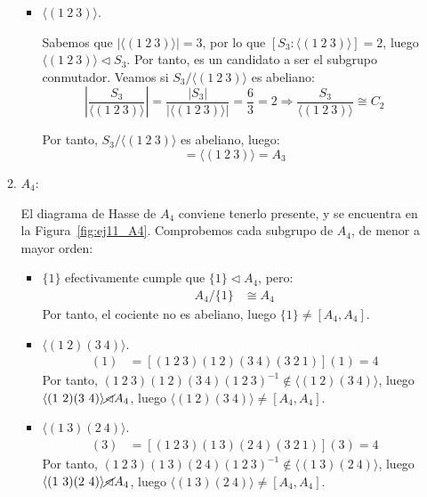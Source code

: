 \begin{ejercicio}
\begin{enumerate}
\begin{enumerate}
\begin{itemize}
                \item $\langle (1\ 2\ 3)\rangle$.
                
                Sabemos que $|\langle (1\ 2\ 3)\rangle|=3$, por lo que $[S_3:\langle (1\ 2\ 3)\rangle]=2$, luego $\langle (1\ 2\ 3)\rangle \lhd S_3$. Por tanto, es un candidato a ser el subgrupo conmutador. Veamos si $S_3/\langle (1\ 2\ 3)\rangle$ es abeliano:
                \begin{equation*}
                    \left|\dfrac{S_3}{\langle (1\ 2\ 3)\rangle}\right| = \frac{|S_3|}{|\langle (1\ 2\ 3)\rangle|} = \frac{6}{3} = 2
                    \Longrightarrow \dfrac{S_3}{\langle (1\ 2\ 3)\rangle} \cong C_2
                \end{equation*}

                Por tanto, $S_3/\langle (1\ 2\ 3)\rangle$ es abeliano, luego:
                \begin{equation*}
                    [S_3,S_3] = \langle (1\ 2\ 3)\rangle = A_3
                \end{equation*}
            \end{itemize}

            \item $A_4$:
            
            El diagrama de Hasse de $A_4$ conviene tenerlo presente, y se encuentra en la Figura~\ref{fig:ej11_A4}. Comprobemos cada subgrupo de $A_4$, de menor a mayor orden:
            \begin{itemize}
                \item $\{1\}$ efectivamente cumple que $\{1\}\lhd A_4$, pero:
                \begin{align*}
                    A_4/\{1\} &\cong A_4
                \end{align*}
                Por tanto, el cociente no es abeliano, luego $\{1\}\neq [A_4,A_4]$.

                \item $\langle (1\ 2)(3\ 4)\rangle$.
                \begin{align*}
                    [(1\ 2\ 3)(1\ 2)(3\ 4)(1\ 2\ 3)^{-1}](1) &= [(1\ 2\ 3)(1\ 2)(3\ 4)(3\ 2\ 1)](1) = 4
                \end{align*}
                Por tanto, $(1\ 2\ 3)(1\ 2)(3\ 4)(1\ 2\ 3)^{-1}\notin \langle (1\ 2)(3\ 4)\rangle$, luego $\langle (1\ 2)(3\ 4)\rangle \cancel{\lhd} A_4$, luego $\langle (1\ 2)(3\ 4)\rangle \neq [A_4,A_4]$.

                \item $\langle (1\ 3)(2\ 4)\rangle$.
                \begin{align*}
                    [(1\ 2\ 3)(1\ 3)(2\ 4)(1\ 2\ 3)^{-1}](3) &= [(1\ 2\ 3)(1\ 3)(2\ 4)(3\ 2\ 1)](3) = 4
                \end{align*}
                Por tanto, $(1\ 2\ 3)(1\ 3)(2\ 4)(1\ 2\ 3)^{-1}\notin \langle (1\ 3)(2\ 4)\rangle$, luego $\langle (1\ 3)(2\ 4)\rangle \cancel{\lhd} A_4$, luego $\langle (1\ 3)(2\ 4)\rangle \neq [A_4,A_4]$.


\end{itemize}
\end{enumerate}
\end{enumerate}
\end{ejercicio}
